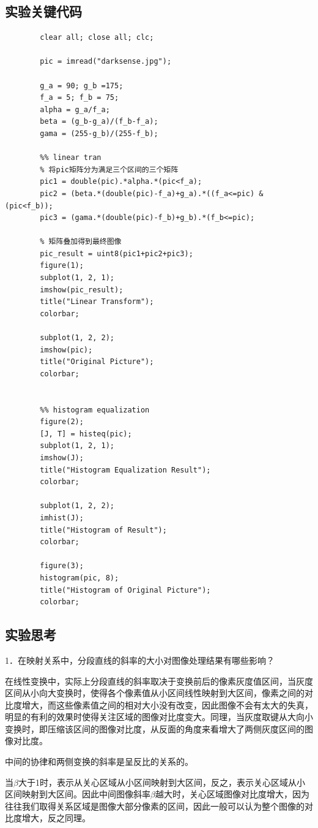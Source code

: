 \documentclass[UTF8]{article} %
\begin{document}
	\subsection{实验关键代码}
	\begin{lstlisting}[style=Matlab-editor]
		% clear
		clear all; close all; clc;
		
		pic = imread("darksense.jpg");
		
		g_a = 90; g_b =175;
		f_a = 5; f_b = 75;
		alpha = g_a/f_a;
		beta = (g_b-g_a)/(f_b-f_a);
		gama = (255-g_b)/(255-f_b);
		
		%% linear tran
		% 将pic矩阵分为满足三个区间的三个矩阵
		pic1 = double(pic).*alpha.*(pic<f_a);
		pic2 = (beta.*(double(pic)-f_a)+g_a).*((f_a<=pic) & (pic<f_b));
		pic3 = (gama.*(double(pic)-f_b)+g_b).*(f_b<=pic);
		
		% 矩阵叠加得到最终图像
		pic_result = uint8(pic1+pic2+pic3);
		figure(1);
		subplot(1, 2, 1);
		imshow(pic_result);
		title("Linear Transform");
		colorbar;
		
		subplot(1, 2, 2);
		imshow(pic);
		title("Original Picture");
		colorbar;
		
		
		%% histogram equalization
		figure(2);
		[J, T] = histeq(pic);
		subplot(1, 2, 1);
		imshow(J);
		title("Histogram Equalization Result");
		colorbar;
		
		subplot(1, 2, 2);
		imhist(J);
		title("Histogram of Result");
		colorbar;
		
		figure(3);
		histogram(pic, 8);
		title("Histogram of Original Picture");
		colorbar;
	\end{lstlisting}

	\subsection{实验思考}
	1．在映射关系中，分段直线的斜率的大小对图像处理结果有哪些影响？
	
	在线性变换中，实际上分段直线的斜率取决于变换前后的像素灰度值区间，当灰度区间从小向大变换时，使得各个像素值从小区间线性映射到大区间，像素之间的对比度增大，而这些像素值之间的相对大小没有改变，因此图像不会有太大的失真，明显的有利的效果时使得关注区域的图像对比度变大。同理，当灰度取键从大向小变换时，即压缩该区间的图像对比度，从反面的角度来看增大了两侧灰度区间的图像对比度。
	
	中间的协律和两侧变换的斜率是呈反比的关系的。
	
	当$\beta$大于1时，表示从关心区域从小区间映射到大区间，反之，表示关心区域从小区间映射到大区间。因此中间图像斜率$\beta$越大时，关心区域图像对比度增大，因为往往我们取得关系区域是图像大部分像素的区间，因此一般可以认为整个图像的对比度增大，反之同理。
	
\end{document}

